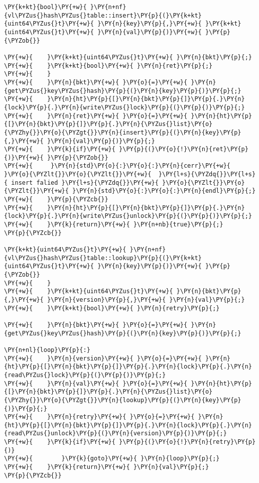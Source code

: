 \begin{Verbatim}[commandchars=\\\{\},codes={\catcode`\$=3\catcode`\^=7\catcode`\_=8\relax}]
\PY{k+kt}{bool}\PY{+w}{ }\PY{n+nf}{vl\PYZus{}hash\PYZus{}table::insert}\PY{p}{(}\PY{k+kt}{uint64\PYZus{}t}\PY{+w}{ }\PY{n}{key}\PY{p}{,}\PY{+w}{ }\PY{k+kt}{uint64\PYZus{}t}\PY{+w}{ }\PY{n}{val}\PY{p}{)}\PY{+w}{ }\PY{p}{\PYZob{}}

\PY{+w}{    }\PY{k+kt}{uint64\PYZus{}t}\PY{+w}{ }\PY{n}{bkt}\PY{p}{;}
\PY{+w}{    }\PY{k+kt}{bool}\PY{+w}{ }\PY{n}{ret}\PY{p}{;}
\PY{+w}{    }
\PY{+w}{    }\PY{n}{bkt}\PY{+w}{ }\PY{o}{=}\PY{+w}{ }\PY{n}{get\PYZus{}key\PYZus{}hash}\PY{p}{(}\PY{n}{key}\PY{p}{)}\PY{p}{;}
\PY{+w}{    }\PY{n}{ht}\PY{p}{[}\PY{n}{bkt}\PY{p}{]}\PY{p}{.}\PY{n}{lock}\PY{p}{.}\PY{n}{write\PYZus{}lock}\PY{p}{(}\PY{p}{)}\PY{p}{;}
\PY{+w}{    }\PY{n}{ret}\PY{+w}{ }\PY{o}{=}\PY{+w}{ }\PY{n}{ht}\PY{p}{[}\PY{n}{bkt}\PY{p}{]}\PY{p}{.}\PY{n}{\PYZus{}list}\PY{o}{\PYZhy{}}\PY{o}{\PYZgt{}}\PY{n}{insert}\PY{p}{(}\PY{n}{key}\PY{p}{,}\PY{+w}{ }\PY{n}{val}\PY{p}{)}\PY{p}{;}
\PY{+w}{    }\PY{k}{if}\PY{+w}{ }\PY{p}{(}\PY{o}{!}\PY{n}{ret}\PY{p}{)}\PY{+w}{ }\PY{p}{\PYZob{}}
\PY{+w}{     }\PY{n}{std}\PY{o}{:}\PY{o}{:}\PY{n}{cerr}\PY{+w}{ }\PY{o}{\PYZlt{}}\PY{o}{\PYZlt{}}\PY{+w}{  }\PY{l+s}{\PYZdq{}}\PY{l+s}{ insert falied }\PY{l+s}{\PYZdq{}}\PY{+w}{ }\PY{o}{\PYZlt{}}\PY{o}{\PYZlt{}}\PY{+w}{ }\PY{n}{std}\PY{o}{:}\PY{o}{:}\PY{n}{endl}\PY{p}{;}
\PY{+w}{    }\PY{p}{\PYZcb{}}
\PY{+w}{    }\PY{n}{ht}\PY{p}{[}\PY{n}{bkt}\PY{p}{]}\PY{p}{.}\PY{n}{lock}\PY{p}{.}\PY{n}{write\PYZus{}unlock}\PY{p}{(}\PY{p}{)}\PY{p}{;}
\PY{+w}{    }\PY{k}{return}\PY{+w}{ }\PY{n+nb}{true}\PY{p}{;}
\PY{p}{\PYZcb{}}

\PY{k+kt}{uint64\PYZus{}t}\PY{+w}{ }\PY{n+nf}{vl\PYZus{}hash\PYZus{}table::lookup}\PY{p}{(}\PY{k+kt}{uint64\PYZus{}t}\PY{+w}{ }\PY{n}{key}\PY{p}{)}\PY{+w}{ }\PY{p}{\PYZob{}}
\PY{+w}{    }
\PY{+w}{    }\PY{k+kt}{uint64\PYZus{}t}\PY{+w}{ }\PY{n}{bkt}\PY{p}{,}\PY{+w}{ }\PY{n}{version}\PY{p}{,}\PY{+w}{ }\PY{n}{val}\PY{p}{;}
\PY{+w}{    }\PY{k+kt}{bool}\PY{+w}{ }\PY{n}{retry}\PY{p}{;}

\PY{+w}{    }\PY{n}{bkt}\PY{+w}{ }\PY{o}{=}\PY{+w}{ }\PY{n}{get\PYZus{}key\PYZus{}hash}\PY{p}{(}\PY{n}{key}\PY{p}{)}\PY{p}{;}

\PY{n+nl}{loop}\PY{p}{:}
\PY{+w}{    }\PY{n}{version}\PY{+w}{ }\PY{o}{=}\PY{+w}{ }\PY{n}{ht}\PY{p}{[}\PY{n}{bkt}\PY{p}{]}\PY{p}{.}\PY{n}{lock}\PY{p}{.}\PY{n}{read\PYZus{}lock}\PY{p}{(}\PY{p}{)}\PY{p}{;}
\PY{+w}{    }\PY{n}{val}\PY{+w}{ }\PY{o}{=}\PY{+w}{ }\PY{n}{ht}\PY{p}{[}\PY{n}{bkt}\PY{p}{]}\PY{p}{.}\PY{n}{\PYZus{}list}\PY{o}{\PYZhy{}}\PY{o}{\PYZgt{}}\PY{n}{lookup}\PY{p}{(}\PY{n}{key}\PY{p}{)}\PY{p}{;}
\PY{+w}{    }\PY{n}{retry}\PY{+w}{ }\PY{o}{=}\PY{+w}{ }\PY{n}{ht}\PY{p}{[}\PY{n}{bkt}\PY{p}{]}\PY{p}{.}\PY{n}{lock}\PY{p}{.}\PY{n}{read\PYZus{}unlock}\PY{p}{(}\PY{n}{version}\PY{p}{)}\PY{p}{;}
\PY{+w}{    }\PY{k}{if}\PY{+w}{ }\PY{p}{(}\PY{o}{!}\PY{n}{retry}\PY{p}{)}
\PY{+w}{        }\PY{k}{goto}\PY{+w}{ }\PY{n}{loop}\PY{p}{;}
\PY{+w}{    }\PY{k}{return}\PY{+w}{ }\PY{n}{val}\PY{p}{;}
\PY{p}{\PYZcb{}}
\end{Verbatim}
